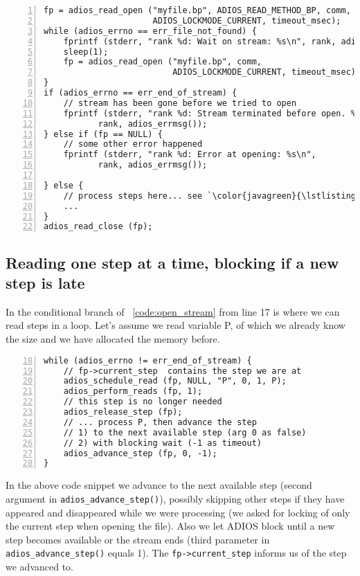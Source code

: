 \begin{lstlisting}[numbers=left, numberstyle=\color{gray}, stepnumber=2,
                   caption={While loop to open a stream},  label=code:open_stream]
fp = adios_read_open ("myfile.bp", ADIOS_READ_METHOD_BP, comm, 
                      ADIOS_LOCKMODE_CURRENT, timeout_msec);
while (adios_errno == err_file_not_found) {
    fprintf (stderr, "rank %d: Wait on stream: %s\n", rank, adios_errmsg());
    sleep(1);
    fp = adios_read_open ("myfile.bp", comm, 
                          ADIOS_LOCKMODE_CURRENT, timeout_msec);
}
if (adios_errno == err_end_of_stream) {
    // stream has been gone before we tried to open
    fprintf (stderr, "rank %d: Stream terminated before open. %s\n",
           rank, adios_errmsg());
} else if (fp == NULL) {
    // some other error happened
    fprintf (stderr, "rank %d: Error at opening: %s\n",
           rank, adios_errmsg());

} else {
    // process steps here... see `\color{javagreen}{\lstlistingname~\ref{code:stream_stepbystep}}`
    ...
}
adios_read_close (fp);
\end{lstlisting}


\subsection{Reading one step at a time, blocking if a new step is late}
In the conditional branch of \lstlistingname~\ref{code:open_stream} from line 17 is where we can read steps in a loop. Let's assume we read variable P, of which we already know the size and we have allocated the memory before.

\begin{lstlisting}[numbers=left, numberstyle=\color{gray}, stepnumber=2,firstnumber=18,
                             caption={Read a bounding box of a variable},  label=code:stream_stepbystep]
while (adios_errno != err_end_of_stream) {
    // fp->current_step  contains the step we are at
    adios_schedule_read (fp, NULL, "P", 0, 1, P);
    adios_perform_reads (fp, 1);   
    // this step is no longer needed 
    adios_release_step (fp); 
    // ... process P, then advance the step
    // 1) to the next available step (arg 0 as false) 
    // 2) with blocking wait (-1 as timeout)
    adios_advance_step (fp, 0, -1);
}
\end{lstlisting}

\noindent In the above code snippet we advance to the next available step (second argument in \verb+adios_advance_step()+), possibly skipping other steps if they have appeared and disappeared while we were processing (we asked for locking of only the current step when opening the file). Also we let ADIOS block until a new step becomes available or the stream ends (third parameter in \verb+adios_advance_step()+ equals 1). The \verb+fp->current_step+ informs us of the step we advanced to.


